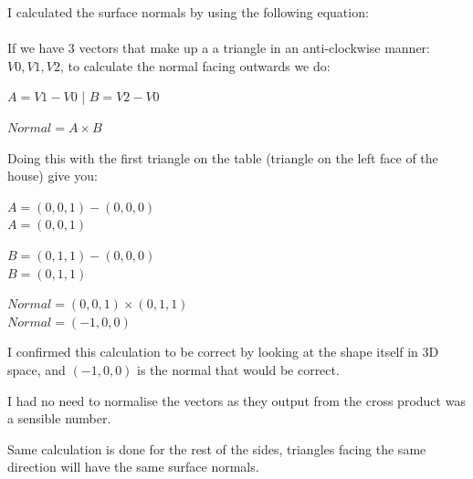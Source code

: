 \documentclass[10pt]{report}
\begin{document}
I calculated the surface normals by using the following equation:\\
\\
If we have 3 vectors that make up a a triangle in an anti-clockwise manner: \(V0, V1, V2\), to calculate the normal facing outwards we do:

\(A = V1 - V0\)  |  \(B = V2 - V0\)

\(Normal = A \times B\)

Doing this with the first triangle on the table (triangle on the left face of the house) give you:

\(A = (0, 0, 1) - (0, 0, 0)\) \\ \(A = (0, 0, 1)\)

\(B = (0, 1, 1) - (0, 0, 0)\) \\ \(B = (0, 1, 1)\)

\(Normal = (0, 0, 1) \times (0, 1, 1)\) \\ \(Normal = (-1, 0, 0)\)

I confirmed this calculation to be correct by looking at the shape itself in 3D space, and \((-1, 0, 0)\) is the normal that would be correct.

I had no need to normalise the vectors as they output from the cross product was a sensible number.

Same calculation is done for the rest of the sides, triangles facing the same direction will have the same surface normals.
\end{document}
